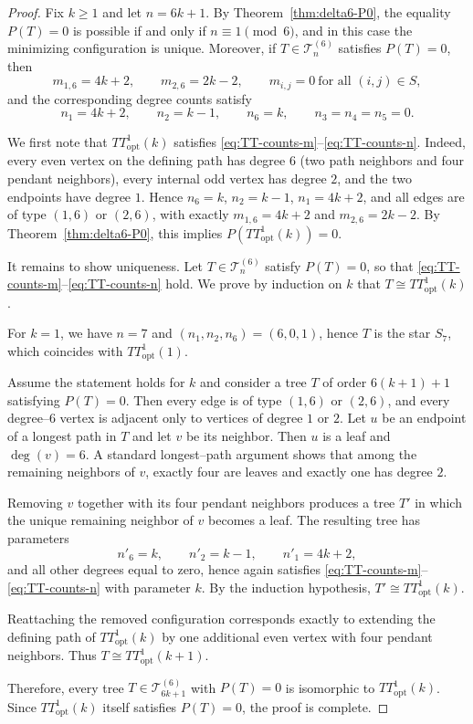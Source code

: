\documentclass[preprint,12pt]{elsarticle}
\begin{document}
\begin{proof}
Fix $k\ge 1$ and let $n=6k+1$.
By Theorem~\ref{thm:delta6-P0}, the equality $P(T)=0$ is possible if and only if
$n\equiv 1\pmod 6$, and in this case the minimizing configuration is unique.
Moreover, if $T\in\mathcal{T}_n^{(6)}$ satisfies $P(T)=0$, then
\begin{equation}
m_{1,6}=4k+2,\qquad
m_{2,6}=2k-2,\qquad
m_{i,j}=0\ \text{for all }(i,j)\in S,
\label{eq:TT-counts-m}
\end{equation}
and the corresponding degree counts satisfy
\begin{equation}
n_1=4k+2,\qquad
n_2=k-1,\qquad
n_6=k,\qquad
n_3=n_4=n_5=0.
\label{eq:TT-counts-n}
\end{equation}

\medskip
We first note that $TT^1_{\mathrm{opt}}(k)$ satisfies
\eqref{eq:TT-counts-m}--\eqref{eq:TT-counts-n}.
Indeed, every even vertex on the defining path has degree $6$ (two path neighbors
and four pendant neighbors), every internal odd vertex has degree $2$, and the
two endpoints have degree $1$.
Hence $n_6=k$, $n_2=k-1$, $n_1=4k+2$, and all edges are of type $(1,6)$ or $(2,6)$,
with exactly $m_{1,6}=4k+2$ and $m_{2,6}=2k-2$.
By Theorem~\ref{thm:delta6-P0}, this implies $P(TT^1_{\mathrm{opt}}(k))=0$.

\medskip
It remains to show uniqueness.
Let $T\in\mathcal{T}_n^{(6)}$ satisfy $P(T)=0$, so that
\eqref{eq:TT-counts-m}--\eqref{eq:TT-counts-n} hold.
We prove by induction on $k$ that $T\cong TT^1_{\mathrm{opt}}(k)$.

For $k=1$, we have $n=7$ and $(n_1,n_2,n_6)=(6,0,1)$, hence $T$ is the star $S_7$,
which coincides with $TT^1_{\mathrm{opt}}(1)$.

Assume the statement holds for $k$ and consider a tree $T$ of order $6(k+1)+1$
satisfying $P(T)=0$.
Then every edge is of type $(1,6)$ or $(2,6)$, and every degree--$6$ vertex is
adjacent only to vertices of degree $1$ or $2$.
Let $u$ be an endpoint of a longest path in $T$ and let $v$ be its neighbor.
Then $u$ is a leaf and $\deg(v)=6$.
A standard longest–path argument shows that among the remaining neighbors of $v$,
exactly four are leaves and exactly one has degree $2$.

Removing $v$ together with its four pendant neighbors produces a tree $T'$ in
which the unique remaining neighbor of $v$ becomes a leaf.
The resulting tree has parameters
\[
n'_6=k,\qquad n'_2=k-1,\qquad n'_1=4k+2,
\]
and all other degrees equal to zero, hence again satisfies
\eqref{eq:TT-counts-m}--\eqref{eq:TT-counts-n} with parameter $k$.
By the induction hypothesis, $T'\cong TT^1_{\mathrm{opt}}(k)$.

Reattaching the removed configuration corresponds exactly to extending the
defining path of $TT^1_{\mathrm{opt}}(k)$ by one additional even vertex with four
pendant neighbors.
Thus $T\cong TT^1_{\mathrm{opt}}(k+1)$.

\medskip
Therefore, every tree $T\in\mathcal{T}_{6k+1}^{(6)}$ with $P(T)=0$ is isomorphic to
$TT^1_{\mathrm{opt}}(k)$.
Since $TT^1_{\mathrm{opt}}(k)$ itself satisfies $P(T)=0$, the proof is complete.
\end{proof}
\end{document}
